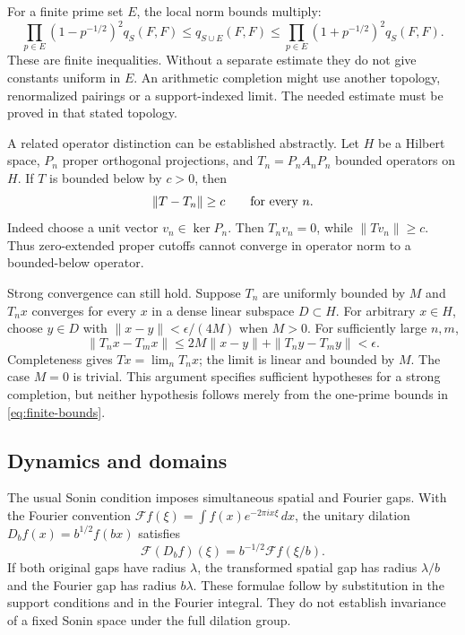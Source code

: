 \documentclass[11pt,letterpaper]{article}
\theoremstyle{definition}
\theoremstyle{remark}
\begin{document}
For a finite prime set $E$, the local norm bounds multiply:
\begin{equation}
 \prod_{p\in E}(1-p^{-1/2})^2q_S(F,F)
 \leq q_{S\cup E}(F,F)
 \leq\prod_{p\in E}(1+p^{-1/2})^2q_S(F,F).
 \label{eq:finite-bounds}
\end{equation}
These are finite inequalities. Without a separate estimate
they do not give constants uniform in $E$. An arithmetic
completion might use another topology, renormalized pairings
or a support-indexed limit. The needed estimate must be
proved in that stated topology.

A related operator distinction can be established abstractly.
Let $H$ be a Hilbert space, $P_n$ proper orthogonal
projections, and $T_n=P_nA_nP_n$ bounded operators on $H$.
If $T$ is bounded below by $c>0$, then
\begin{equation}
 \|T-T_n\|\geq c\qquad\hbox{for every }n.
 \label{eq:norm-limit-obstruction}
\end{equation}
Indeed choose a unit vector $v_n\in\ker P_n$.
Then $T_nv_n=0$, while $\|Tv_n\|\geq c$.
Thus zero-extended proper cutoffs cannot converge in
operator norm to a bounded-below operator.

Strong convergence can still hold. Suppose $T_n$ are
uniformly bounded by $M$ and $T_nx$ converges for every
$x$ in a dense linear subspace $D\subset H$.
For arbitrary $x\in H$, choose $y\in D$ with
$\|x-y\|<\epsilon/(4M)$ when $M>0$.
For sufficiently large $n,m$,
\[
 \|T_nx-T_mx\|
 \leq2M\|x-y\|+\|T_ny-T_my\|<\epsilon.
\]
Completeness gives $Tx=\lim_nT_nx$; the limit is linear
and bounded by $M$. The case $M=0$ is trivial.
This argument specifies sufficient hypotheses for a
strong completion, but neither hypothesis follows merely
from the one-prime bounds in \eqref{eq:finite-bounds}.

\subsection{Dynamics and domains}

The usual Sonin condition imposes simultaneous spatial
and Fourier gaps. With the Fourier convention
$\mathcal Ff(\xi)=\int f(x)e^{-2\pi ix\xi}\,dx$, the
unitary dilation $D_bf(x)=b^{1/2}f(bx)$ satisfies
\[
 \mathcal F(D_bf)(\xi)=b^{-1/2}\mathcal Ff(\xi/b).
\]
If both original gaps have radius $\lambda$, the transformed
spatial gap has radius $\lambda/b$ and the Fourier gap
has radius $b\lambda$. These formulae follow by substitution
in the support conditions and in the Fourier integral.
They do not establish invariance of a fixed Sonin space
under the full dilation group.
\end{document}
